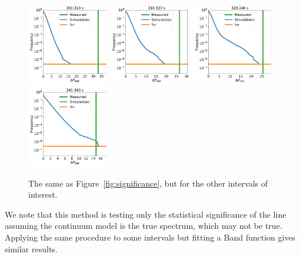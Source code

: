 \documentclass{aastex61}
\begin{document}
\begin{figure}
\includegraphics[width=0.32\textwidth]{figures/300-310_log.pdf}
\includegraphics[width=0.32\textwidth]{figures/310-320_log.pdf}
\includegraphics[width=0.32\textwidth]{figures/320-340_log.pdf}
\includegraphics[width=0.32\textwidth]{figures/340-360_log.pdf}
    \caption{The same as Figure~\ref{fig:significance}, but for the other intervals of interest.}
    \label{fig:other_significances}
\end{figure}


We note that this method is testing only the statistical significance of the line assuming the continuum model is the true spectrum, which may not be true. Applying the same procedure to some intervals but fitting a Band \citep{1993ApJ...413..281B} function gives similar results. 
\end{document}
